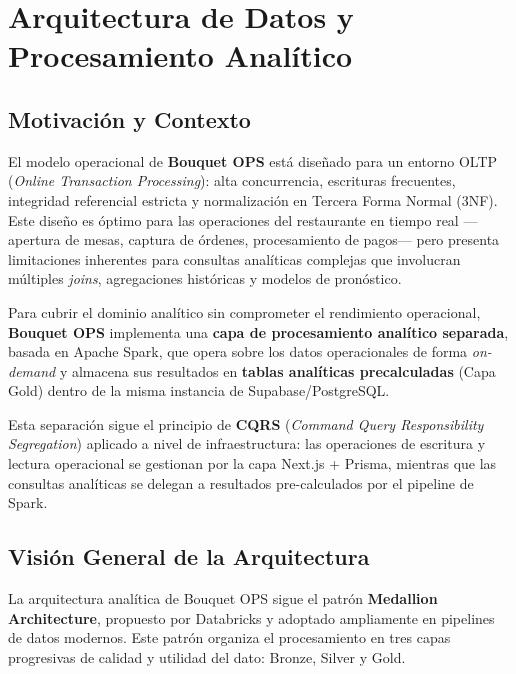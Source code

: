\documentclass[12pt, letterpaper]{article}
\begin{document}

\section{Arquitectura de Datos y Procesamiento Analítico}

\subsection{Motivación y Contexto}

El modelo operacional de \textbf{Bouquet OPS} está diseñado para un entorno OLTP (\textit{Online Transaction Processing}): alta concurrencia, escrituras frecuentes, integridad referencial estricta y normalización en Tercera Forma Normal (3NF). Este diseño es óptimo para las operaciones del restaurante en tiempo real —apertura de mesas, captura de órdenes, procesamiento de pagos— pero presenta limitaciones inherentes para consultas analíticas complejas que involucran múltiples \textit{joins}, agregaciones históricas y modelos de pronóstico.

Para cubrir el dominio analítico sin comprometer el rendimiento operacional, \textbf{Bouquet OPS} implementa una \textbf{capa de procesamiento analítico separada}, basada en Apache Spark, que opera sobre los datos operacionales de forma \textit{on-demand} y almacena sus resultados en \textbf{tablas analíticas precalculadas} (Capa Gold) dentro de la misma instancia de Supabase/PostgreSQL.

Esta separación sigue el principio de \textbf{CQRS} (\textit{Command Query Responsibility Segregation}) aplicado a nivel de infraestructura: las operaciones de escritura y lectura operacional se gestionan por la capa Next.js + Prisma, mientras que las consultas analíticas se delegan a resultados pre-calculados por el pipeline de Spark.

\subsection{Visión General de la Arquitectura}

La arquitectura analítica de Bouquet OPS sigue el patrón \textbf{Medallion Architecture}, propuesto por Databricks y adoptado ampliamente en pipelines de datos modernos. Este patrón organiza el procesamiento en tres capas progresivas de calidad y utilidad del dato: Bronze, Silver y Gold.
\end{document}
